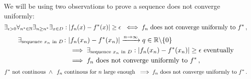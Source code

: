 \documentclass[week=10]{homework}
\begin{document}
\begin{questions}
		We will be using two observations to prove a sequence does not converge uniformly:
		\begin{equation} \label{Q4:notunif:def}
			\exists_{\epsilon > 0}\forall_{n^* \in \naturals}\exists_{n \geq n^*}\exists_{x \in D}: |f_n(x) - f^*(x)| \geq \epsilon\ \iff  f_n \text{ does not converge uniformly to } f^*\,,
		\end{equation}
		\begin{align}\label{Q4:notunif:seq}
		\begin{split}
		\exists_{\text{sequence } x_n \text{ in } D}\colon &|f_n(x_n) - f^*(x_n)| \xrightarrow{n\to\infty} q \in \reals\backslash\{0\} \\
		&\implies \exists_{\text{sequence } x_n \text{ in } D}: |f_n(x_n) - f^*(x_n)| \geq \epsilon \text{ eventually} \\ 
		&\implies f_n \text{ does not converge uniformly to } f^*\,,
		\end{split}
		\end{align}
		\begin{equation} \label{Q4:notunif:cont}
		f^* \text{ not continous } \wedge \enskip f_n \text{ continous for }n\text{ large enough } \implies f_n \text{ does not converge uniformly to } f^*\,.
		\end{equation}
		
\end{questions}
\end{document}
